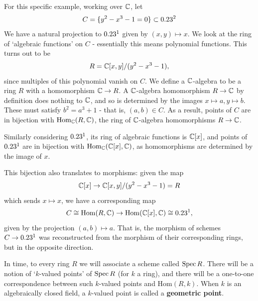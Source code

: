 \begin{example}
    For this specific example, working over $\mathbb{C}$, let
    \[
    C=\{y^2-x^3-1=0\}\subset 0.23^2
    \]
    We have a natural projection to $0.23^1$ given by $(x,y)\mapsto x$. We look at the ring of `algebraic functions' on $C$ - essentially this means polynomial functions. This turns out to be
    \[
    R=\mathbb{C}[x,y]/(y^2-x^3-1),
    \]
    since multiples of this polynomial vanish on $C$. We define a $\mathbb{C}$-algebra to be a ring $R$ with a homomorphism $\mathbb{C}\to R$. A $\mathbb{C}$-algebra homomorphism $R\to \mathbb{C}$ by definition does nothing to $\mathbb{C}$, and so is determined by the images $x\mapsto a,y\mapsto b$. These must satisfy $b^2=a^3+1$ - that is, $(a,b)\in C$. As a result, points of $C$ are in bijection with $\mathrm{Hom}_{\mathbb{C}}(R,\mathbb{C})$, the ring of $\mathbb{C}$-algebra homomorphisms $R\to \mathbb{C}$.
    
    Similarly considering $0.23^1$, its ring of algebraic functions is $\mathbb{C}[x]$, and points of $0.23^1$ are in bijection with $\mathrm{Hom}_{\mathbb{C}}(\mathbb{C}[x],\mathbb{C})$, as homomorphisms are determined by the image of $x$. 
    
    This bijection also translates to morphisms: given the map
    \[
    \mathbb{C}[x]\to \mathbb{C}[x,y]/(y^2-x^3-1)=R
    \]
    which sends $x\mapsto x$, we have a corresponding map
    \[
    C\cong \mathrm{Hom}(R,\mathbb{C})\to \mathrm{Hom}(\mathbb{C}[x],\mathbb{C})\cong 0.23^1,
    \]
    given by the projection $(a,b)\mapsto a$. That is, the morphism of schemes $C\to0.23^1$ was reconstructed from the morphism of their corresponding rings, but in the opposite direction. 
\end{example}
\begin{remark}
    In time, to every ring $R$ we will associate a scheme called $\operatorname{Spec} R$. There will be a notion of `$k$-valued points' of $\operatorname{Spec} R$ (for $k$ a ring), and there will be a one-to-one correspondence between such $k$-valued points and $\mathrm{Hom}(R,k)$. When $k$ is an algebraically closed field, a $k$-valued point is called a \textbf{geometric point}.
\end{remark}
